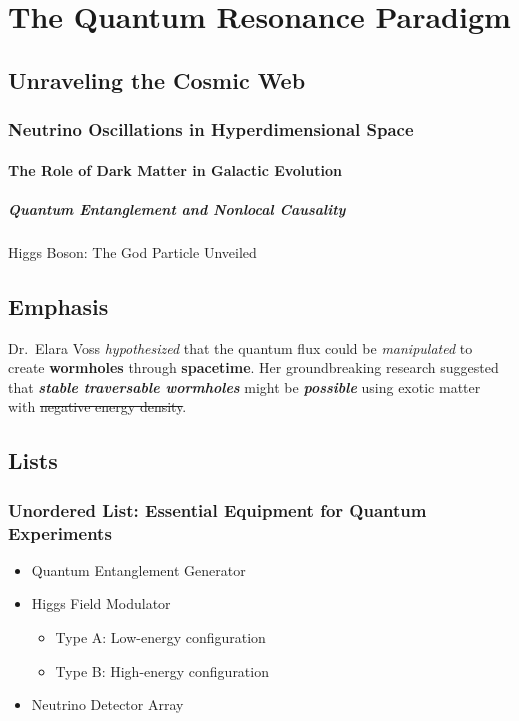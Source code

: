 \section{The Quantum Resonance
Paradigm}\label{the-quantum-resonance-paradigm}

\subsection{Unraveling the Cosmic Web}\label{unraveling-the-cosmic-web}

\subsubsection{Neutrino Oscillations in Hyperdimensional
Space}\label{neutrino-oscillations-in-hyperdimensional-space}

\paragraph{The Role of Dark Matter in Galactic
Evolution}\label{the-role-of-dark-matter-in-galactic-evolution}

\subparagraph{Quantum Entanglement and Nonlocal
Causality}\label{quantum-entanglement-and-nonlocal-causality}

Higgs Boson: The God Particle Unveiled

\subsection{Emphasis}\label{emphasis}

Dr.~Elara Voss \emph{hypothesized} that the quantum flux could be
\emph{manipulated} to create \textbf{wormholes} through
\textbf{spacetime}. Her groundbreaking research suggested that
\textbf{\emph{stable traversable wormholes}} might be
\textbf{\emph{possible}} using exotic matter with \st{negative energy
density}.

\subsection{Lists}\label{lists}

\subsubsection{Unordered List: Essential Equipment for Quantum
Experiments}\label{unordered-list-essential-equipment-for-quantum-experiments}

\begin{itemize}
\tightlist
\item
  Quantum Entanglement Generator
\item
  Higgs Field Modulator

  \begin{itemize}
  \tightlist
  \item
    Type A: Low-energy configuration
  \item
    Type B: High-energy configuration
  \end{itemize}
\item
  Neutrino Detector Array
\end{itemize}

